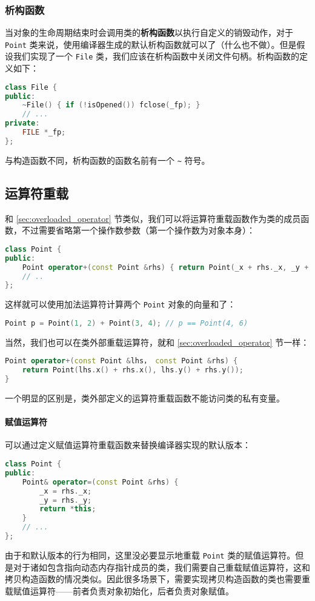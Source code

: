 \documentclass[hyperref,UTF8]{article}
\begin{document}
\subsubsection{析构函数}

当对象的生命周期结束时会调用类的\textbf{析构函数}以执行自定义的销毁动作，对于 \texttt{Point} 类来说，使用编译器生成的默认析构函数就可以了（什么也不做）。但是假设我们实现了一个 \texttt{File} 类，我们应该在析构函数中关闭文件句柄。析构函数的定义如下：
\begin{lstlisting}[language=c++]
class File {
public:
    ~File() { if (!isOpened()) fclose(_fp); }
    // ...
private:
    FILE *_fp;
};
\end{lstlisting}
与构造函数不同，析构函数的函数名前有一个 \texttt{\textasciitilde} 符号。

\subsection{运算符重载}

和 \ref{sec:overloaded_operator} 节类似，我们可以将运算符重载函数作为类的成员函数，不过需要省略第一个操作数参数（第一个操作数为对象本身）：
\begin{lstlisting}[language=c++]
class Point {
public:
    Point operator+(const Point &rhs) { return Point(_x + rhs._x, _y + rhs.y); }
    // ..
};
\end{lstlisting}
这样就可以使用加法运算符计算两个 \texttt{Point} 对象的向量和了：
\begin{lstlisting}[language=c++,numbers=none]
Point p = Point(1, 2) + Point(3, 4); // p == Point(4, 6)
\end{lstlisting}

当然，我们也可以在类外部重载运算符，就和 \ref{sec:overloaded_operator} 节一样：
\begin{lstlisting}[language=c++]
Point operator+(const Point &lhs， const Point &rhs) {
    return Point(lhs.x() + rhs.x(), lhs.y() + rhs.y());
}
\end{lstlisting}
一个明显的区别是，类外部定义的运算符重载函数不能访问类的私有变量。

\paragraph{赋值运算符}

可以通过定义赋值运算符重载函数来替换编译器实现的默认版本：
\begin{lstlisting}[language=c++]
class Point {
public:
    Point& operator=(const Point &rhs) {
        _x = rhs._x;
        _y = rhs._y;
        return *this;
    }
    // ...
};
\end{lstlisting}
由于和默认版本的行为相同，这里没必要显示地重载 \texttt{Point} 类的赋值运算符。但是对于诸如包含指向动态内存指针成员的类，我们需要自己重载赋值运算符，这和拷贝构造函数的情况类似。因此很多场景下，需要实现拷贝构造函数的类也需要重载赋值运算符——前者负责对象初始化，后者负责对象赋值。
\end{document}
